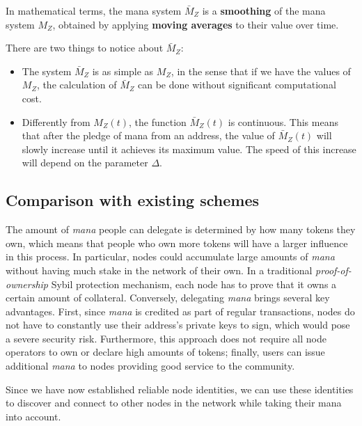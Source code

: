 \documentclass[../main.tex]{subfiles}
\begin{document}
In mathematical terms, the mana system $\bar{M}_Z$ is a \textbf{smoothing} of the mana system $M_Z$, obtained by applying \textbf{moving averages} to their value over time. 

There are two things to notice about $\bar{M}_Z$:
\begin{itemize}
    \item The system $\bar{M}_Z$ is as simple as $M_Z$, in the sense that if we have the values of $M_Z$, the calculation of $\bar{M}_Z$ can be done without significant computational cost.
    \item Differently from $M_Z(t)$, the function $\bar{M}_Z(t)$ is continuous. This means that after the pledge of mana from an address, the value of  $\bar{M}_Z(t)$ will slowly increase until it achieves its maximum value. The speed of this increase will depend on the parameter $\Delta$.
\end{itemize}


\subsection{Comparison with existing schemes}

The amount of \textit{mana} people can delegate is determined by how many tokens they own, which means that people who own more tokens will have a larger influence in this process.
In particular, nodes could accumulate large amounts of \textit{mana} without having much stake in the network of their own.
In a traditional \textit{proof-of-ownership} Sybil protection mechanism, each node has to prove that it owns a certain amount of collateral. Conversely, delegating \textit{mana} brings several key advantages.
First, since \textit{mana} is credited as part of regular transactions, nodes do not have to constantly use their address's private keys to sign, which would pose a severe security risk.
Furthermore, this approach does not require all node operators to own or declare high amounts of tokens; finally, users can issue additional \textit{mana} to nodes providing good service to the community.

Since we have now established reliable node identities, we can use these identities to discover and connect to other nodes in the network
while taking their mana into account.
\end{document}
